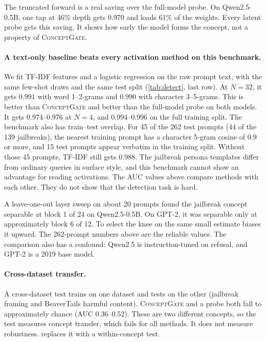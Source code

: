 \documentclass[11pt]{article}
\newcommand{\cg}{\textsc{ConceptGate}}
\begin{document}
The truncated forward is a real saving over the full-model probe. On Qwen2.5-0.5B, one tap at 46\% depth
gets 0.970 and loads 61\% of the weights. Every latent probe gets this saving. It shows how early the model forms the concept, not a property of \cg{}.

\paragraph{A text-only baseline beats every activation method on this benchmark.} We fit TF-IDF features
and a logistic regression on the raw prompt text, with the same few-shot draws and the same test split
(\cref{tab:detect}, last row). At $N=32$, it gets $0.991$ with word 1--2-grams and $0.990$ with character
3--5-grams. This is better than \cg{} and better than the full-model probe on both models. It gets
0.974--0.976 at $N=4$, and 0.994--0.996 on the full training split. The benchmark also has train--test overlap.
For 45 of the 262 test prompts (44 of the 139 jailbreaks), the nearest training prompt has a character
5-gram cosine of 0.9 or more, and 15 test prompts appear verbatim in the training split. Without those 45
prompts, TF-IDF still gets 0.988. The jailbreak persona templates differ from ordinary queries in surface style, and this benchmark cannot show an advantage for reading activations. The AUC values above
compare methods with each other. They do not show that the detection task is hard.

A leave-one-out layer sweep on about 20 prompts found the jailbreak concept separable at block 1 of 24 on
Qwen2.5-0.5B. On GPT-2, it was separable only at approximately block 6 of 12. To select the knee on the same
small estimate biases it upward. The 262-prompt numbers above are the reliable values. The comparison also
has a confound: Qwen2.5 is instruction-tuned on refusal, and GPT-2 is a 2019 base model.

\paragraph{Cross-dataset transfer.} A cross-dataset test trains on one dataset and tests on the
other (jailbreak framing and BeaverTails harmful content). \cg{} and a probe both fall to approximately
chance (AUC 0.36--0.52). These are two different concepts, so the test measures concept transfer, which fails for all methods. It does not measure robustness. 
replaces it with a within-concept test.
\end{document}
